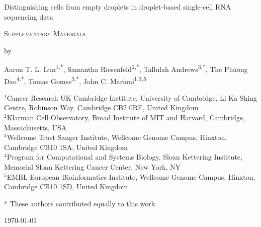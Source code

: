 \documentclass{article}
\begin{document}
\begin{titlepage}
\vspace*{3cm}
\begin{center}


{\LARGE
Distinguishing cells from empty droplets in droplet-based single-cell RNA sequencing data
\par}

\vspace{0.75cm}

{\Large
    \textsc{Supplementary Materials}
\par
}
\vspace{0.75cm}

\large
by


\vspace{0.75cm}
Aaron T. L. Lun\textsuperscript{1,*},
Samantha Riesenfeld\textsuperscript{2,*},
Tallulah Andrews\textsuperscript{3,*},
The Phuong Dao\textsuperscript{4,*},
Tomas Gomes\textsuperscript{3,*},
John C. Marioni\textsuperscript{1,3,5}

\vspace{1cm}
\begin{minipage}{0.9\textwidth}
\begin{flushleft}
$^1$Cancer Research UK Cambridge Institute, University of Cambridge, Li Ka Shing Centre, Robinson Way, Cambridge CB2 0RE, United Kingdom \\[6pt]
$^2$Klarman Cell Observatory, Broad Institute of MIT and Harvard, Cambridge, Massachusetts, USA \\[6pt]
$^3$Wellcome Trust Sanger Institute, Wellcome Genome Campus, Hinxton, Cambridge CB10 1SA, United Kingdom \\[6pt]
$^4$Program for Computational and Systems Biology, Sloan Kettering Institute, Memorial Sloan Kettering Cancer Center, New York, NY \\[6pt]
$^5$EMBL European Bioinformatics Institute, Wellcome Genome Campus, Hinxton, Cambridge CB10 1SD, United Kingdom
\end{flushleft}
* These authors contributed equally to this work.
\end{minipage}

\vspace{1.5cm}
{\large \today{}}

\vspace*{\fill}
\end{center}
\end{titlepage}
\end{document}
